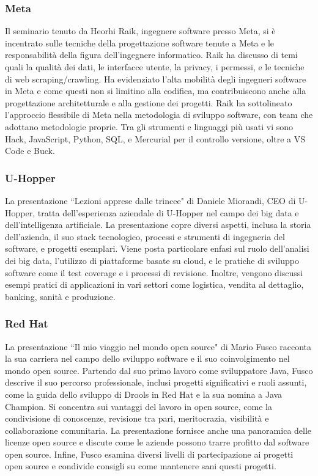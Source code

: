 \documentclass[11pt, a4paper]{article}
\theoremstyle{definition}
\begin{document}
\subsubsection{Meta}
Il seminario tenuto da Heorhi Raik, ingegnere software presso Meta, si è
incentrato sulle tecniche della progettazione software tenute a Meta e le
responsabilità della figura dell'ingegnere informatico. Raik ha discusso
di temi quali la qualità dei dati, le interfacce
utente, la privacy, i permessi, e le tecniche di web scraping/crawling.
Ha evidenziato l'alta mobilità degli ingegneri software in Meta e come
questi non si limitino alla codifica, ma contribuiscono anche alla
progettazione architetturale e alla gestione dei progetti. Raik ha
sottolineato l'approccio flessibile di Meta nella metodologia di sviluppo
software, con team che adottano metodologie proprie. Tra gli strumenti e
linguaggi più usati vi sono Hack, JavaScript, Python, SQL, e Mercurial
per il controllo versione, oltre a VS Code e Buck.



\subsubsection{U-Hopper}
La presentazione ``Lezioni apprese dalle trincee" di Daniele Miorandi,
CEO di U-Hopper, tratta dell'esperienza aziendale di U-Hopper nel
campo dei big data e dell'intelligenza artificiale. La presentazione copre
diversi aspetti, inclusa la storia dell'azienda, il suo stack tecnologico,
processi e strumenti di ingegneria del software, e progetti esemplari.
Viene posta particolare enfasi sul ruolo dell'analisi dei big data,
l'utilizzo di piattaforme basate su cloud, e le pratiche di sviluppo
software come il test coverage e i processi di revisione. Inoltre, vengono
discussi esempi pratici di applicazioni in vari settori come logistica,
vendita al dettaglio, banking, sanità e produzione.

\subsubsection{Red Hat}
La presentazione ``Il mio viaggio nel mondo open source" di Mario Fusco
racconta la sua carriera nel campo dello sviluppo software e il suo
coinvolgimento nel mondo open source. Partendo dal suo primo lavoro
come sviluppatore Java, Fusco descrive il suo percorso professionale,
inclusi progetti significativi e ruoli assunti, come la guida dello
sviluppo di Drools in Red Hat e la sua nomina a Java Champion. Si concentra
sui vantaggi del lavoro in open source, come la condivisione di conoscenze,
revisione tra pari, meritocrazia, visibilità e collaborazione comunitaria.
La presentazione fornisce anche una panoramica delle licenze open source e
discute come le aziende possono trarre profitto dal software open source.
Infine, Fusco esamina diversi livelli di partecipazione ai progetti open
source e condivide consigli su come mantenere sani questi progetti.
\end{document}
